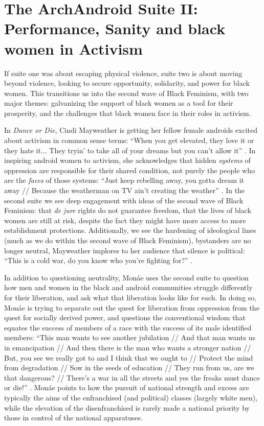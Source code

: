\documentclass[a4paper, 11pt]{article} %
\begin{document}

\section*{The ArchAndroid Suite II: Performance, Sanity and black women in Activism}

If suite one was about escaping physical violence, suite two is about moving beyond violence, looking to secure opportunity, solidarity, and power for black women.
This transitions us into the second wave of Black Feminism, with two major themes: galvanizing the support of black women as a tool for their prosperity, and the challenges that black women face in their roles in activism.

In \emph{Dance or Die}, Cindi Mayweather is getting her fellow female androids excited about activism in common sense terms:
``When you get elevated, they love it or they hate it... They tryin' to take all of your dreams but you can't allow it'' .
In inspiring android women to activism, she acknowledges that hidden \emph{systems} of oppression are responsible for their shared condition, not purely the people who are the \emph{faces} of those systems:
``Just keep rebelling away, you gotta dream it away // Because the weatherman on TV ain't creating the weather'' . 
In the second suite we see deep engagement with ideas of the second wave of Black Feminism: that \emph{de jure} rights do not guarantee freedom, that the lives of black women are still at risk, despite the fact they might have more access to more establishment protections.
Additionally, we see the hardening of ideological lines (much as we do within the second wave of Black Feminism), bystanders are no longer neutral, Mayweather implores to her audience that silence is political:
``This is a cold war, do you know who you're fighting for?'' .

In addition to questioning neutrality, Mon\'ae uses the second suite to question how men and women in the black and android communities struggle differently for their liberation, and ask what that liberation looks like for each.
In doing so, Mon\'ae is trying to separate out the quest for liberation from oppression from the quest for socially derived power, and questions the conventional wisdom that equates the success of members of a race with the success of its male identified members:
``This man wants to see another jubilation //
And that man wants us in emancipation //
And then there is the man who wants a stronger nation //
But, you see we really got to and I think that we ought to //
Protect the mind from degradation //
Sow in the seeds of education //
They run from us, are we that dangerous? //
There's a war in all the streets and yes the freaks must dance or die!'' .
Mon\'ae points to how the pursuit of national strength and excess are typically the aims of the enfranchised (and political) classes (largely white men), while the elevation of the disenfranchised is rarely made a national priority by those in control of the national apparatuses.
\end{document}
